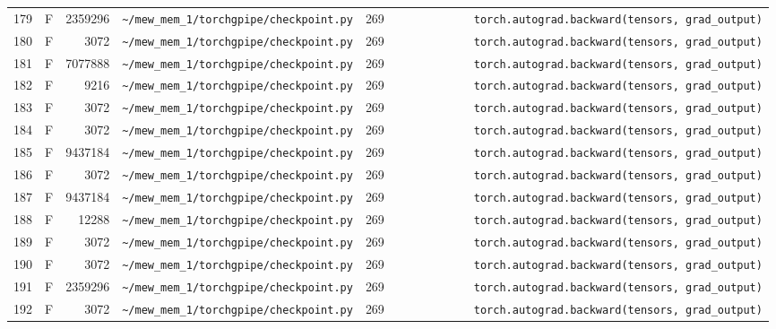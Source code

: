 \documentclass{article}
\begin{document}
\begin{longtable}{r l r p{6.5cm} r p{7.0cm}}
179 & F & 2359296 & \lstinline|~/mew_mem_1/torchgpipe/checkpoint.py| & 269 & \lstinline|            torch.autograd.backward(tensors, grad_output)| \\
180 & F & 3072 & \lstinline|~/mew_mem_1/torchgpipe/checkpoint.py| & 269 & \lstinline|            torch.autograd.backward(tensors, grad_output)| \\
181 & F & 7077888 & \lstinline|~/mew_mem_1/torchgpipe/checkpoint.py| & 269 & \lstinline|            torch.autograd.backward(tensors, grad_output)| \\
182 & F & 9216 & \lstinline|~/mew_mem_1/torchgpipe/checkpoint.py| & 269 & \lstinline|            torch.autograd.backward(tensors, grad_output)| \\
183 & F & 3072 & \lstinline|~/mew_mem_1/torchgpipe/checkpoint.py| & 269 & \lstinline|            torch.autograd.backward(tensors, grad_output)| \\
184 & F & 3072 & \lstinline|~/mew_mem_1/torchgpipe/checkpoint.py| & 269 & \lstinline|            torch.autograd.backward(tensors, grad_output)| \\
185 & F & 9437184 & \lstinline|~/mew_mem_1/torchgpipe/checkpoint.py| & 269 & \lstinline|            torch.autograd.backward(tensors, grad_output)| \\
186 & F & 3072 & \lstinline|~/mew_mem_1/torchgpipe/checkpoint.py| & 269 & \lstinline|            torch.autograd.backward(tensors, grad_output)| \\
187 & F & 9437184 & \lstinline|~/mew_mem_1/torchgpipe/checkpoint.py| & 269 & \lstinline|            torch.autograd.backward(tensors, grad_output)| \\
188 & F & 12288 & \lstinline|~/mew_mem_1/torchgpipe/checkpoint.py| & 269 & \lstinline|            torch.autograd.backward(tensors, grad_output)| \\
189 & F & 3072 & \lstinline|~/mew_mem_1/torchgpipe/checkpoint.py| & 269 & \lstinline|            torch.autograd.backward(tensors, grad_output)| \\
190 & F & 3072 & \lstinline|~/mew_mem_1/torchgpipe/checkpoint.py| & 269 & \lstinline|            torch.autograd.backward(tensors, grad_output)| \\
191 & F & 2359296 & \lstinline|~/mew_mem_1/torchgpipe/checkpoint.py| & 269 & \lstinline|            torch.autograd.backward(tensors, grad_output)| \\
192 & F & 3072 & \lstinline|~/mew_mem_1/torchgpipe/checkpoint.py| & 269 & \lstinline|            torch.autograd.backward(tensors, grad_output)| \\

\end{longtable}
\end{document}
